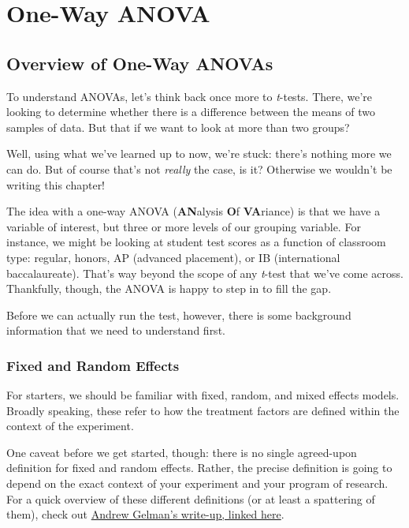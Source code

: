 

\chapter{One-Way ANOVA}

\section{Overview of One-Way ANOVAs}

To understand ANOVAs, let's think back once more to \textit{t}-tests. There, we're looking to determine whether there is a difference between the means of two samples of data. But that if we want to look at more than two groups? 

Well, using what we've learned up to now, we're stuck: there's nothing more we can do. But of course that's not \textit{really} the case, is it? Otherwise we wouldn't be writing this chapter!

The idea with a one-way ANOVA (\textbf{AN}alysis \textbf{O}f \textbf{VA}riance) is that we have a variable of interest, but three or more levels of our grouping variable. For instance, we might be looking at student test scores as a function of classroom type: regular, honors, AP (advanced placement), or IB (international baccalaureate). That's way beyond the scope of any \textit{t}-test that we've come across. Thankfully, though, the ANOVA is happy to step in to fill the gap.

Before we can actually run the test, however, there is some background information that we need to understand first.

\subsection{Fixed and Random Effects}

For starters, we should be familiar with fixed, random, and mixed effects models. Broadly speaking, these refer to how the treatment factors are defined within the context of the experiment.

One caveat before we get started, though: there is no single agreed-upon definition for fixed and random effects. Rather, the precise definition is going to depend on the exact context of your experiment and your program of research. For a quick overview of these different definitions (or at least a spattering of them), check out \href{http://andrewgelman.com/2005/01/25/why_i_dont_use/}{Andrew Gelman's write-up, linked here}.

